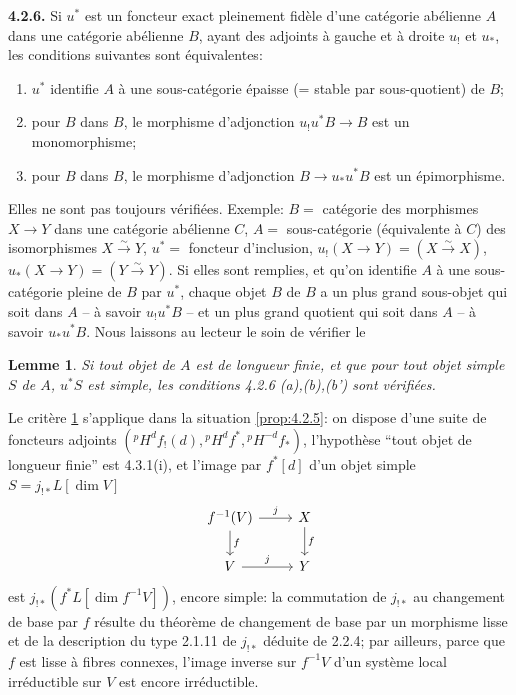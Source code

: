 \documentclass[12pt,a4paper]{article}
\theoremstyle{plain}
\newtheorem{lemma}[theorem]{Lemme}
\theoremstyle{definition}
\newcommand{\isom}{\xrightarrow{\sim}}
\begin{document}
\noindent\textbf{4.2.6.} Si $u^{*}$ est un foncteur exact pleinement fid\`{e}le d'une cat\'{e}gorie ab\'{e}lienne $A$ dans une cat\'{e}gorie ab\'{e}lienne $B$, ayant des adjoints \`{a} gauche et \`{a} droite $u_{!}$ et $u_{*}$, les conditions suivantes sont \'{e}quivalentes:
\begin{enumerate}
\item[(a)] $u^{*}$ identifie $A$ \`{a} une sous-cat\'{e}gorie \'{e}paisse (= stable par sous-quotient) de $B$;
\item[(b)] pour $B$ dans $B$, le morphisme d'adjonction $u_{!}u^{*}B \longrightarrow B$ est un monomorphisme;
\item[(b')] pour $B$ dans $B$, le morphisme d'adjonction $B \to u_{*}u^{*}B$ est un \'{e}pimorphisme.
\end{enumerate}
Elles ne sont pas toujours v\'{e}rifi\'{e}es. Exemple: $B =$ cat\'{e}gorie des morphismes $X \to Y$ dans une cat\'{e}gorie ab\'{e}lienne $C$, $A =$ sous-cat\'{e}gorie (\'{e}quivalente \`{a} $C$) des isomorphismes $X \isom Y$, $u^{*} =$ foncteur d'inclusion, $u_{!}(X \to Y) = (X \isom X)$, $u_{*}(X \to Y) = (Y \isom Y)$. Si elles sont remplies, et qu'on identifie $A$ \`{a} une sous-cat\'{e}gorie pleine de $B$ par $u^{*}$, chaque objet $B$ de $B$ a un plus grand sous-objet qui soit dans $A$ -- \`{a} savoir $u_{!}u^{*}B$ -- et un plus grand quotient qui soit dans $A$ -- \`{a} savoir $u_{*}u^{*}B$. Nous laissons au lecteur le soin de v\'{e}rifier le

\begin{lemma}\label{lem:4.2.6.1}
Si tout objet de $A$ est de longueur finie, et que pour tout objet simple $S$ de $A$, $u^{*}S$ est simple, les conditions 4.2.6 (a),(b),(b') sont v\'{e}rifi\'{e}es.
\end{lemma}

Le crit\`{e}re \ref{lem:4.2.6.1} s'applique dans la situation \ref{prop:4.2.5}: on dispose d'une suite de foncteurs adjoints $({}^{p}H^{d}f_{!}(d), {}^{p}H^{d}f^{*}, {}^{p}H^{-d}f_{*})$, l'hypoth\`{e}se ``tout objet de longueur finie'' est 4.3.1(i), et l'image par $f^{*}[d]$ d'un objet simple $S = j_{!*}L[\dim V]$
\[
\begin{tikzcd}
f^{-1}(V) \rar{j} \dar{f} & X \dar{f} \\
V \rar{j} & Y
\end{tikzcd}
\]
est $j_{!*}(f^{*}L[\dim f^{-1}V])$, encore simple: la commutation de $j_{!*}$ au changement de base par $f$ r\'{e}sulte du th\'{e}or\`{e}me de changement de base par un morphisme lisse et de la description du type 2.1.11 de $j_{!*}$ d\'{e}duite de 2.2.4; par ailleurs, parce que $f$ est lisse \`{a} fibres connexes, l'image inverse sur $f^{-1}V$ d'un syst\`{e}me local irr\'{e}ductible sur $V$ est encore irr\'{e}ductible.
\end{document}
